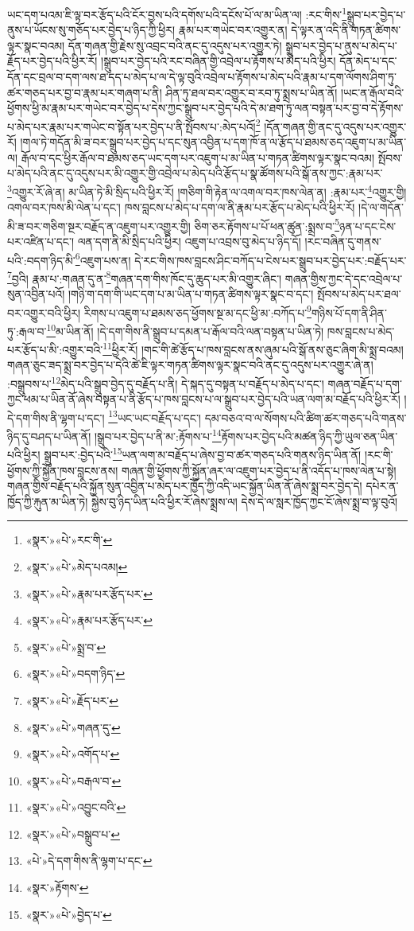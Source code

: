 ཡང་དག་པའམ་ཇི་ལྟ་བར་རྩོད་པའི་ངོར་བྱས་པའི་དགོས་པའི་དངོས་པོ་ལ་མ་ཡིན་ལ། :རང་གིས་\footnote{«སྣར་»«པེ་»རང་གི་}སྒྲུབ་པར་བྱེད་པ་ནུས་པ་ཡོངས་སུ་གཅོད་པར་བྱེད་པ་ཉིད་ཀྱི་ཕྱིར། རྣམ་པར་གཡེང་བར་འགྱུར་ན། དེ་ལྟར་ན་འདི་ནི་གཏན་ཚིགས་ལྟར་སྣང་བའམ། དོན་གཞན་གྱི་རྗེས་སུ་འབྲང་བའི་ནང་དུ་འདུས་པར་འགྱུར་ཏེ། སྒྲུབ་པར་བྱེད་པ་ནུས་པ་མེད་པ་རྗོད་པར་བྱེད་པའི་ཕྱིར་རོ། །སྒྲུབ་པར་བྱེད་པའི་རང་བཞིན་གྱི་འབྲེལ་པ་རྟོགས་པ་མེད་པའི་ཕྱིར། དོན་མེད་པ་དང་དོན་དང་བྲལ་བ་དག་ལས་ཐ་དད་པ་མེད་པ་ལ་དེ་ལྟ་བུའི་འབྲེལ་པ་རྟོགས་པ་མེད་པའི་རྣམ་པ་དག་ལོགས་ཤིག་ཏུ་ཚར་གཅད་པར་བྱ་བ་རྣམ་པར་གཞག་པ་ནི། ཤིན་ཏུ་ཐལ་བར་འགྱུར་བ་རབ་ཏུ་སྨྲས་པ་ཡིན་ནོ། །ཡང་ན་རྒོལ་བའི་ཕྱོགས་ཕྱི་མ་རྣམ་པར་གཡེང་བར་བྱེད་པ་དེས་ཀྱང་སྒྲུབ་པར་བྱེད་པའི་དེ་མ་ཐག་ཏུ་ལན་བསྟན་པར་བྱ་བ་དེ་རྟོགས་པ་མེད་པར་རྣམ་པར་གཡེང་བ་སྟོན་པར་བྱེད་པ་ནི་སྤོབས་པ་:མེད་པའོ།\footnote{«སྣར་»«པེ་»མེད་པའམ།} །དོན་གཞན་གྱི་ནང་དུ་འདུས་པར་འགྱུར་རོ། །གལ་ཏེ་གདོན་མི་ཟ་བར་སྒྲུབ་པར་བྱེད་པ་དང་སུན་འབྱིན་པ་དག་ཁོ་ན་ལ་རྩོད་པ་ཐམས་ཅད་འཇུག་པ་མ་ཡིན་ལ། རྒོལ་བ་དང་ཕྱིར་རྒོལ་བ་ཐམས་ཅད་ཡང་དག་པར་འཇུག་པ་མ་ཡིན་པ་གཏན་ཚིགས་ལྟར་སྣང་བའམ། སྤོབས་པ་མེད་པའི་ནང་དུ་འདུས་པར་མི་འགྱུར་གྱི་འབྲེལ་པ་མེད་པའི་རྩོད་པ་སྣ་ཚོགས་པའི་སྒོ་ནས་ཀྱང་:རྣམ་པར་\footnote{«སྣར་»«པེ་»རྣམ་པར་རྩོད་པར་}འགྱུར་རོ་ཞེ་ན། མ་ཡིན་ཏེ་མི་སྲིད་པའི་ཕྱིར་རོ། །གཅིག་གི་རྟེན་ལ་འགལ་བར་ཁས་ལེན་ན། :རྣམ་པར་\footnote{«སྣར་»«པེ་»རྣམ་པར་རྩོད་པར་}འགྱུར་གྱི། འགལ་བར་ཁས་མི་ལེན་པ་དང་། ཁས་བླངས་པ་མེད་པ་དག་ལ་ནི་རྣམ་པར་རྩོད་པ་མེད་པའི་ཕྱིར་རོ། །དེ་ལ་གདོན་མི་ཟ་བར་གཅིག་སྔར་བརྗོད་ན་འཇུག་པར་འགྱུར་གྱི། ཅིག་ཅར་རྟོགས་པ་པོ་ཕན་ཚུན་:སྨྲས་བ་\footnote{«སྣར་»«པེ་»སྨྲ་བ་}ཉན་པ་དང་ངེས་པར་འཛིན་པ་དང་། ལན་དག་ནི་མི་སྲིད་པའི་ཕྱིར། འཇུག་པ་འབྲས་བུ་མེད་པ་ཉིད་དོ། །རང་བཞིན་དུ་གནས་པའི་:བདག་ཉིད་མི་\footnote{«སྣར་»«པེ་»བདག་ཉིད་}འཇུག་པས་ན། དེ་རང་གིས་ཁས་བླངས་ཤིང་བཀོད་པ་ངེས་པར་སྒྲུབ་པར་བྱེད་པར་:བརྗོད་པར་\footnote{«སྣར་»«པེ་»རྗོད་པར་}བྱའི། རྣམ་པ་:གཞན་དུ་ན་\footnote{«སྣར་»«པེ་»གཞན་དུ་}གཞན་དག་གིས་ཁོང་དུ་ཆུད་པར་མི་འགྱུར་ཞིང་། གཞན་གྱིས་ཀྱང་དེ་དང་འབྲེལ་པ་སུན་འབྱིན་པའོ། །གཉི་ག་དག་གི་ཡང་དག་པ་མ་ཡིན་པ་གཏན་ཚིགས་ལྟར་སྣང་བ་དང་། སྤོབས་པ་མེད་པར་ཐལ་བར་འགྱུར་བའི་ཕྱིར། རིགས་པ་འཇུག་པ་ཐམས་ཅད་ཕྱོགས་སྔ་མ་དང་ཕྱི་མ་:བཀོད་པ་\footnote{«སྣར་»«པེ་»འགོད་པ་}གཉིས་པོ་དག་ནི་ཤིན་ཏུ་:རྒལ་བ་\footnote{«སྣར་»«པེ་»བརྒལ་བ་}མ་ཡིན་ནོ། །དེ་དག་གིས་ནི་སྒྲུབ་པ་དམན་པ་རྒོལ་བའི་ལན་བསྟན་པ་ཡིན་ཏེ། ཁས་བླངས་པ་མེད་པར་རྩོད་པ་མི་:འགྱུར་བའི་\footnote{«སྣར་»«པེ་»འབྱུང་བའི་}ཕྱིར་རོ། །གང་གི་ཚེ་རྩོད་པ་ཁས་བླངས་ནས་ཞུམ་པའི་སྒོ་ནས་ཅུང་ཞིག་མི་སྨྲ་བའམ། གཞན་ཅུང་ཟད་སྨྲ་བར་བྱེད་པ་དེའི་ཚེ་ཇི་ལྟར་གཏན་ཚིགས་ལྟར་སྣང་བའི་ནང་དུ་འདུས་པར་འགྱུར་ཞེ་ན། :བསྒྲུབས་པ་\footnote{«སྣར་»«པེ་»བསྒྲུབ་པ་}མེད་པའི་སྒྲུབ་བྱེད་དུ་བརྗོད་པ་ནི། དེ་སྐད་དུ་བསྟན་པ་བརྗོད་པ་མེད་པ་དང་། གཞན་བརྗོད་པ་དག་ཀྱང་ཕམ་པ་ཡིན་ནོ་ཞེས་བསྟན་པ་ནི་རྩོད་པ་ཁས་བླངས་པ་ལ་སྒྲུབ་པར་བྱེད་པའི་ཡན་ལག་མ་བརྗོད་པའི་ཕྱིར་རོ། །དེ་དག་གིས་ནི་ལྷག་པ་དང་། \footnote{«པེ་»དེ་དག་གིས་ནི་ལྷག་པ་དང་}ཡང་ཡང་བརྗོད་པ་དང་། དམ་བཅའ་བ་ལ་སོགས་པའི་ཚིག་ཚར་གཅད་པའི་གནས་ཉིད་དུ་བཤད་པ་ཡིན་ནོ། །སྒྲུབ་པར་བྱེད་པ་ནི་མ་:རྟོགས་པ་\footnote{«སྣར་»རྟོགས་}རྟོགས་པར་བྱེད་པའི་མཚན་ཉིད་ཀྱི་ཡུལ་ཅན་ཡིན་པའི་ཕྱིར། སྒྲུབ་པར་:བྱེད་པའི་\footnote{«སྣར་»«པེ་»བྱེད་པ་}ཡན་ལག་མ་བརྗོད་པ་ཞེས་བྱ་བ་ཚར་གཅད་པའི་གནས་ཉིད་ཡིན་ནོ། །རང་གི་ཕྱོགས་ཀྱི་སྐྱོན་ཁས་བླངས་ནས། གཞན་གྱི་ཕྱོགས་ཀྱི་སྐྱོན་ཞར་ལ་འཇུག་པར་བྱེད་པ་ནི་འདོད་པ་ཁས་ལེན་པ་སྟེ། གཞན་གྱིས་བརྗོད་པའི་སྐྱོན་སུན་འབྱིན་པ་མེད་པར་ཁྱོད་ཀྱི་འདི་ཡང་སྐྱོན་ཡིན་ནོ་ཞེས་སྨྲ་བར་བྱེད་དེ། དཔེར་ན་ཁྱོད་ཀྱི་རྐུན་མ་ཡིན་ཏེ། སྐྱེས་བུ་ཉིད་ཡིན་པའི་ཕྱིར་རོ་ཞེས་སྨྲས་ལ། དེས་དེ་ལ་སླར་ཁྱོད་ཀྱང་ངོ་ཞེས་སྨྲ་བ་ལྟ་བུའོ། 